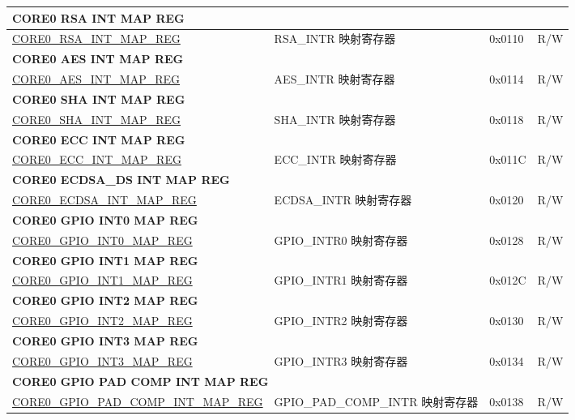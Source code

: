 \begin{longtable}{ | p{8.7cm} | p{6.2cm} | p{1.3cm} | p{1cm} | }
\multicolumn{4}{|l|}{\textbf{CORE0 RSA INT MAP REG}} \\ \hline
\hyperref[regdesc:CORE0RSAINTMAPREG]{CORE0\_RSA\_INT\_MAP\_REG} & RSA\_INTR 映射寄存器 & 0x0110 & R/W \\ \hline
\multicolumn{4}{|l|}{\textbf{CORE0 AES INT MAP REG}} \\ \hline
\hyperref[regdesc:CORE0AESINTMAPREG]{CORE0\_AES\_INT\_MAP\_REG} & AES\_INTR 映射寄存器 & 0x0114 & R/W \\ \hline
\multicolumn{4}{|l|}{\textbf{CORE0 SHA INT MAP REG}} \\ \hline
\hyperref[regdesc:CORE0SHAINTMAPREG]{CORE0\_SHA\_INT\_MAP\_REG} & SHA\_INTR 映射寄存器 & 0x0118 & R/W \\ \hline
\multicolumn{4}{|l|}{\textbf{CORE0 ECC INT MAP REG}} \\ \hline
\hyperref[regdesc:CORE0ECCINTMAPREG]{CORE0\_ECC\_INT\_MAP\_REG} & ECC\_INTR 映射寄存器 & 0x011C & R/W \\ \hline
\multicolumn{4}{|l|}{\textbf{CORE0 ECDSA\_DS INT MAP REG}} \\ \hline
\hyperref[regdesc:CORE0ECDSAINTMAPREG]{CORE0\_ECDSA\_INT\_MAP\_REG} & ECDSA\_INTR 映射寄存器 & 0x0120 & R/W \\ \hline
\multicolumn{4}{|l|}{\textbf{CORE0 GPIO INT0 MAP REG}} \\ \hline
\hyperref[regdesc:CORE0GPIOINT0MAPREG]{CORE0\_GPIO\_INT0\_MAP\_REG} & GPIO\_INTR0 映射寄存器 & 0x0128 & R/W \\ \hline
\multicolumn{4}{|l|}{\textbf{CORE0 GPIO INT1 MAP REG}} \\ \hline
\hyperref[regdesc:CORE0GPIOINT1MAPREG]{CORE0\_GPIO\_INT1\_MAP\_REG} & GPIO\_INTR1 映射寄存器 & 0x012C & R/W \\ \hline
\multicolumn{4}{|l|}{\textbf{CORE0 GPIO INT2 MAP REG}} \\ \hline
\hyperref[regdesc:CORE0GPIOINT2MAPREG]{CORE0\_GPIO\_INT2\_MAP\_REG} & GPIO\_INTR2 映射寄存器 & 0x0130 & R/W \\ \hline
\multicolumn{4}{|l|}{\textbf{CORE0 GPIO INT3 MAP REG}} \\ \hline
\hyperref[regdesc:CORE0GPIOINT3MAPREG]{CORE0\_GPIO\_INT3\_MAP\_REG} & GPIO\_INTR3 映射寄存器 & 0x0134 & R/W \\ \hline
\multicolumn{4}{|l|}{\textbf{CORE0 GPIO PAD COMP INT MAP REG}} \\ \hline
\hyperref[regdesc:CORE0GPIOPADCOMPINTMAPREG]{CORE0\_GPIO\_PAD\_COMP\_INT\_MAP\_REG} & GPIO\_PAD\_COMP\_INTR 映射寄存器 & 0x0138 & R/W \\ \hline

\end{longtable}
